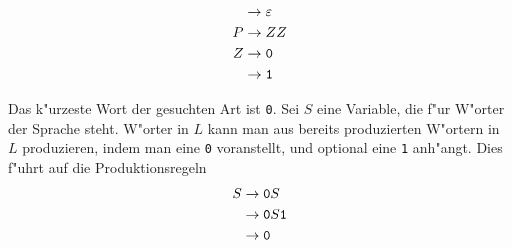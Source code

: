 {\begin{loesung}
\begin{teilaufgaben}
\begin{align*}
 &\rightarrow \varepsilon\\
P&\rightarrow ZZ\\
Z&\rightarrow {\tt 0}\\
 &\rightarrow {\tt 1}
\end{align*}
\item
Das k"urzeste Wort der gesuchten Art ist {\tt 0}. Sei $S$ eine
Variable, die f"ur W"orter der Sprache steht. W"orter in $L$
kann man aus bereits produzierten W"ortern in $L$ produzieren,
indem man  eine {\tt 0} voranstellt, und optional eine {\tt 1}
anh"angt. Dies f"uhrt auf die Produktionsregeln
\begin{align*}
S&\rightarrow {\tt 0}S\\
 &\rightarrow {\tt 0}S{\tt 1}\\
 &\rightarrow {\tt 0}
\end{align*}
\end{teilaufgaben}
\end{loesung}
}{}

